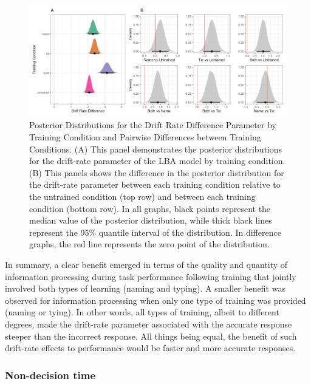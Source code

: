 \documentclass[
  man, donotrepeattitle,floatsintext]{apa6}
\begin{document}
\begin{figure}[H]

{\centering \includegraphics[height=0.67\textheight,]{../figures/from_file/drift_rate} 

}

\caption{Posterior Distributions for the Drift Rate Difference Parameter by Training Condition and Pairwise Differences between Training Conditions. (A) This panel demonstrates the posterior distributions for the drift-rate parameter of the LBA model by training condition. (B) This panels shows the difference in the posterior distribution for the drift-rate parameter between each training condition relative to the untrained condition (top row) and between each training condition (bottom row). In all graphs, black points represent the median value of the posterior distribution, while thick black lines represent the 95\% quantile interval of the distribution. In difference graphs, the red line represents the zero point of the distribution.}\label{fig:drift-rate-plot}
\end{figure}

In summary, a clear benefit emerged in terms of the quality and quantity of information processing during task performance following training that jointly involved both types of learning (naming and typing). A smaller benefit was observed for information processing when only one type of training was provided (naming or tying). In other words, all types of training, albeit to different degrees, made the drift-rate parameter associated with the accurate response steeper than the incorrect response. All things being equal, the benefit of such drift-rate effects to performance would be faster and more accurate responses.

\subsubsection{Non-decision time}\label{non-decision-time}
\end{document}
